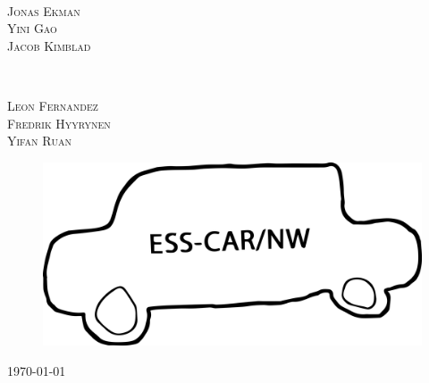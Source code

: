 \documentclass[11pt, titlepage]{article} %
\begin{document}
\begin{titlepage}
	\HRule\\[1.5cm]	
	
	
	\begin{minipage}{0.4\textwidth}
		\begin{flushleft}
			\large
                        \textsc{Jonas Ekman}
			\\
			\textsc{Yini Gao}
                        \\
                        \textsc{Jacob Kimblad}
		\end{flushleft}
	\end{minipage}
	~
	\begin{minipage}{0.4\textwidth}
		\begin{flushright}
			\large
                        \textsc{Leon Fernandez}
			\\
			\textsc{Fredrik Hyyrynen}
                        \\
                        \textsc{Yifan Ruan}
		\end{flushright}
	\end{minipage}
	
	\vskip 8cm
	\begin{figure}[H]
   		\centering
    	\includegraphics[scale=0.4]{funLogo.png}
	\end{figure}
	
	\vfill\vfill\vfill %
	
	{\large\today} %
	

\end{titlepage}
\end{document}
